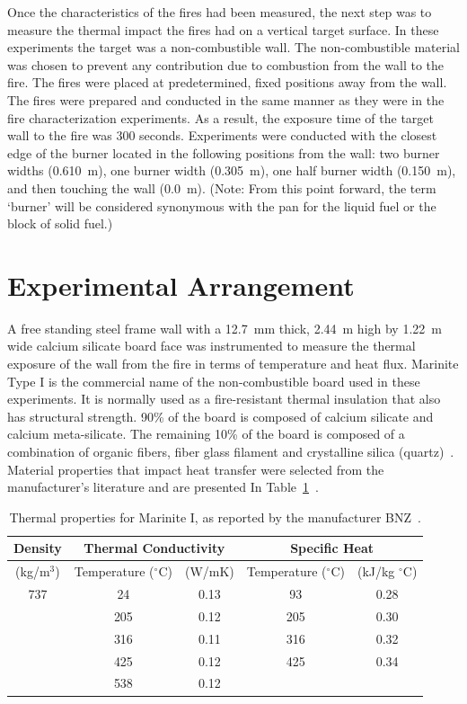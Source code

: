 \documentclass[twoside]{uocthesis}
\begin{document}
{Once the characteristics of the fires had been measured, the next step was to measure the thermal impact the fires had on a vertical target surface.  In these experiments the target was a non-combustible wall. The non-combustible material was chosen to prevent any contribution due to combustion from the wall to the fire.  The fires were placed at predetermined, fixed positions away from the wall. The fires were prepared and conducted in the same manner as they were in the fire characterization experiments. As a result, the exposure time of the target wall to the fire was 300 seconds.  Experiments were conducted with the closest edge of the burner located in the following positions from the wall: two burner widths (0.610~m), one burner width (0.305~m), one half burner width (0.150~m), and then touching the wall (0.0~m).  (Note: From this point forward, the term `burner' will be considered synonymous with the pan for the liquid fuel or the block of solid fuel.)

\section{Experimental Arrangement}

A free standing steel frame wall with a 12.7~mm thick, 2.44~m high by 1.22~m wide calcium silicate board face was instrumented to measure the thermal exposure of the wall from the fire in terms of temperature and heat flux. Marinite Type I is the commercial name of the non-combustible board used in these experiments.  It is normally used as a fire-resistant thermal insulation that also has structural strength. 90\% of the board is composed of calcium silicate and calcium meta-silicate.  The remaining 10\% of the board is composed of a combination of organic fibers, fiber glass filament and crystalline silica (quartz)~\cite{BNZ:MSDS}.  Material properties that impact heat transfer were selected from the manufacturer's literature and are presented In Table~\ref{tab:Marinite_Thermal_Properties}~\cite{Marinite:1997}.

\begin{table}[h]
	\centering
\begin{tabular}{|c|c|c|c|c|}
	\hline Density & \multicolumn{2}{c|}{Thermal Conductivity} & \multicolumn{2}{c|}{Specific Heat}   \\
	\hline (kg/m$^3$) & Temperature ($^\circ$C) & (W/mK)  & Temperature ($^\circ$C)  & (kJ/kg $^\circ$C) \\ \hline
	\hline 737  & 24 & 0.13 & 93 & 0.28 \\
	\hline  & 205 & 0.12  & 205 & 0.30 \\
	\hline  & 316 & 0.11 & 316 & 0.32 \\
	\hline  & 425 & 0.12 & 425 & 0.34 \\
	\hline  & 538 & 0.12 &  &  \\
	\hline
\end{tabular}
\caption[Thermal properties for Marinite I]{Thermal properties for Marinite I, as reported by the manufacturer BNZ~\cite{Marinite:1997}.}
\label{tab:Marinite_Thermal_Properties}
\end{table}

}
\end{document}
